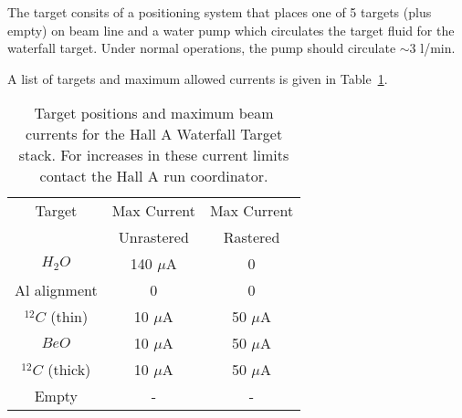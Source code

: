 The target consits of a positioning system that places one of 5 targets
(plus empty) on beam line and a water pump which circulates the target
fluid for the waterfall target. Under normal operations, the pump
should circulate $\sim 3$ l/min. 
\begin{safetyen}{20}{15}
A list of targets and maximum allowed
currents is given in Table~\ref{tab:target-list}. 
\end{safetyen}

\begin{table}[htp]
\begin{center}
\begin{tabular}{|c|c|c|}
\hline 
Target& Max Current& Max Current\\
      &Unrastered  & Rastered\\
\hline\hline 
$H_{2}O$         & 140 $\mu$A &   0 \\ \hline
Al alignment     &   0        &   0 \\ \hline
$^{12}C$ (thin)  &  10 $\mu$A &  50 $\mu$A \\ \hline
$BeO$            &  10 $\mu$A &  50 $\mu$A \\ \hline
$^{12}C$ (thick) &  10 $\mu$A &  50 $\mu$A \\ \hline
Empty            & -          &  -         \\ \hline
\end{tabular}
\end{center}
\caption[Waterfall target: maximum beam currents]{Target positions and maximum beam currents for the Hall A Waterfall
  Target stack. For increases in these current
  limits contact the Hall A run coordinator.}
\label{tab:target-list}
\end{table}



